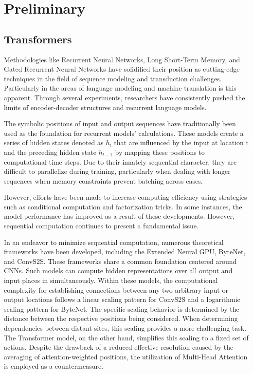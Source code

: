 \chapter{Preliminary}

\section{Transformers}

Methodologies like Recurrent Neural Networks, Long Short-Term Memory, and Gated Recurrent Neural Networks have solidified their position as cutting-edge techniques in the field of sequence modeling and transduction challenges. Particularly in the areas of language modeling and machine translation is this apparent. Through several experiments, researchers have consistently pushed the limits of encoder-decoder structures and recurrent language models.


The symbolic positions of input and output sequences have traditionally been used as the foundation for recurrent models' calculations. These models create a series of hidden states denoted as $h_t$ that are influenced by the input at location t and the preceding hidden state $h_{t-1}$ by mapping these positions to computational time steps. Due to their innately sequential character, they are difficult to parallelize during training, particularly when dealing with longer sequences when memory constraints prevent batching across cases.

However, efforts have been made to increase computing efficiency using strategies such as conditional computation and factorization tricks. In some instances, the model performance has improved as a result of these developments. However, sequential computation continues to present a fundamental issue.


In an endeavor to minimize sequential computation, numerous theoretical frameworks have been developed, including the Extended Neural GPU, ByteNet, and ConvS2S. These frameworks share a common foundation centered around CNNs. Such models can compute hidden representations over all output and input places in simultaneously. Within these models, the computational complexity for establishing connections between any two arbitrary input or output locations follows a linear scaling pattern for ConvS2S and a logarithmic scaling pattern for ByteNet. The specific scaling behavior is determined by the distance between the respective positions being considered. When determining dependencies between distant sites, this scaling provides a more challenging task. The Transformer model, on the other hand, simplifies this scaling to a fixed set of actions. Despite the drawback of a reduced effective resolution caused by the averaging of attention-weighted positions, the utilization of Multi-Head Attention is employed as a countermeasure.


